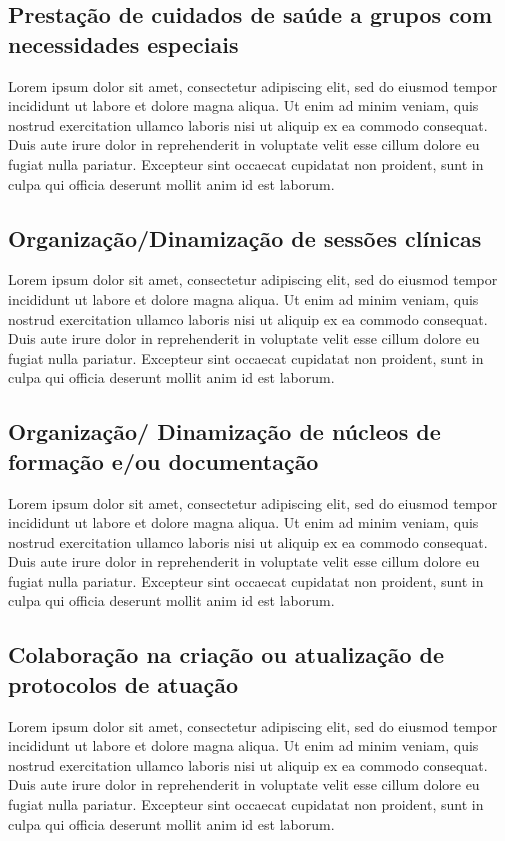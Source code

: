 \documentclass{report}
\begin{document}
\subsection{Prestação de cuidados de saúde a grupos com necessidades especiais}
Lorem ipsum dolor sit amet, consectetur adipiscing elit, sed do eiusmod tempor incididunt ut labore et dolore magna aliqua. Ut enim ad minim veniam, quis nostrud exercitation ullamco laboris nisi ut aliquip ex ea commodo consequat. Duis aute irure dolor in reprehenderit in voluptate velit esse cillum dolore eu fugiat nulla pariatur. Excepteur sint occaecat cupidatat non proident, sunt in culpa qui officia deserunt mollit anim id est laborum.
\subsection{Organização/Dinamização de sessões clínicas}
Lorem ipsum dolor sit amet, consectetur adipiscing elit, sed do eiusmod tempor incididunt ut labore et dolore magna aliqua. Ut enim ad minim veniam, quis nostrud exercitation ullamco laboris nisi ut aliquip ex ea commodo consequat. Duis aute irure dolor in reprehenderit in voluptate velit esse cillum dolore eu fugiat nulla pariatur. Excepteur sint occaecat cupidatat non proident, sunt in culpa qui officia deserunt mollit anim id est laborum.
\subsection{Organização/ Dinamização de núcleos de formação e/ou documentação}
Lorem ipsum dolor sit amet, consectetur adipiscing elit, sed do eiusmod tempor incididunt ut labore et dolore magna aliqua. Ut enim ad minim veniam, quis nostrud exercitation ullamco laboris nisi ut aliquip ex ea commodo consequat. Duis aute irure dolor in reprehenderit in voluptate velit esse cillum dolore eu fugiat nulla pariatur. Excepteur sint occaecat cupidatat non proident, sunt in culpa qui officia deserunt mollit anim id est laborum.
\subsection{Colaboração na criação ou atualização de protocolos de atuação}
Lorem ipsum dolor sit amet, consectetur adipiscing elit, sed do eiusmod tempor incididunt ut labore et dolore magna aliqua. Ut enim ad minim veniam, quis nostrud exercitation ullamco laboris nisi ut aliquip ex ea commodo consequat. Duis aute irure dolor in reprehenderit in voluptate velit esse cillum dolore eu fugiat nulla pariatur. Excepteur sint occaecat cupidatat non proident, sunt in culpa qui officia deserunt mollit anim id est laborum.
\end{document}
